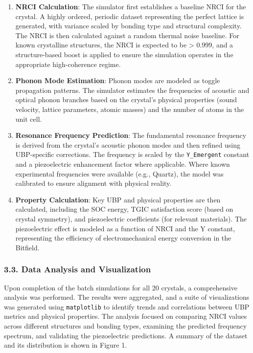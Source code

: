 \begin{enumerate}
\def\labelenumi{\arabic{enumi}.}
\item
  \textbf{NRCI Calculation}: The simulator first establishes a baseline
  NRCI for the crystal. A highly ordered, periodic dataset representing
  the perfect lattice is generated, with variance scaled by bonding type
  and structural complexity. The NRCI is then calculated against a
  random thermal noise baseline. For known crystalline structures, the
  NRCI is expected to be \textgreater{} 0.999, and a structure-based
  boost is applied to ensure the simulation operates in the appropriate
  high-coherence regime.
\item
  \textbf{Phonon Mode Estimation}: Phonon modes are modeled as toggle
  propagation patterns. The simulator estimates the frequencies of
  acoustic and optical phonon branches based on the crystal's physical
  properties (sound velocity, lattice parameters, atomic masses) and the
  number of atoms in the unit cell.
\item
  \textbf{Resonance Frequency Prediction}: The fundamental resonance
  frequency is derived from the crystal's acoustic phonon modes and then
  refined using UBP-specific corrections. The frequency is scaled by the
  \texttt{Y\_Emergent} constant and a piezoelectric enhancement factor
  where applicable. Where known experimental frequencies were available
  (e.g., Quartz), the model was calibrated to ensure alignment with
  physical reality.
\item
  \textbf{Property Calculation}: Key UBP and physical properties are
  then calculated, including the SOC energy, TGIC satisfaction score
  (based on crystal symmetry), and piezoelectric coefficients (for
  relevant materials). The piezoelectric effect is modeled as a function
  of NRCI and the Y constant, representing the efficiency of
  electromechanical energy conversion in the Bitfield.
\end{enumerate}

\subsubsection{3.3. Data Analysis and
Visualization}\label{data-analysis-and-visualization}

Upon completion of the batch simulations for all 20 crystals, a
comprehensive analysis was performed. The results were aggregated, and a
suite of visualizations was generated using \texttt{matplotlib} to
identify trends and correlations between UBP metrics and physical
properties. The analysis focused on comparing NRCI values across
different structures and bonding types, examining the predicted
frequency spectrum, and validating the piezoelectric predictions. A
summary of the dataset and its distribution is shown in Figure 1.

